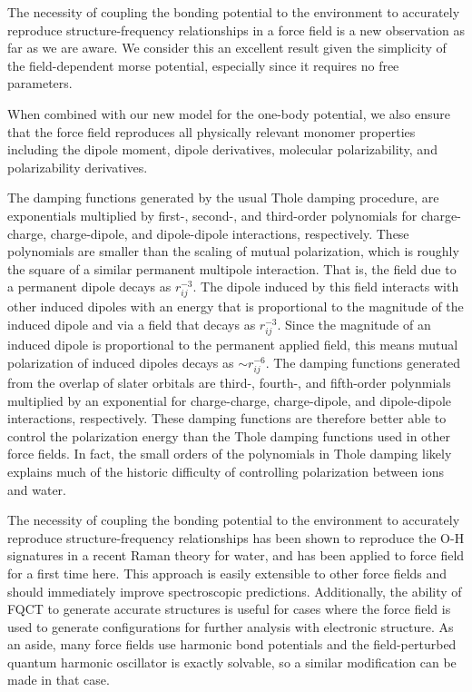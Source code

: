\documentclass[journal=jctcce,manuscript=article]{achemso}
\begin{document}
The necessity of coupling the bonding potential to the environment to accurately reproduce structure-frequency relationships in a force field is a new observation as far as we are aware. We consider this an excellent result given the simplicity of the field-dependent morse potential, especially since it requires no free parameters. 

When combined with our new model for the one-body potential, we also ensure that the force field reproduces all physically relevant monomer properties including the dipole moment, dipole derivatives,
molecular polarizability, and polarizability derivatives. 

The damping functions generated by the usual Thole damping procedure\cite{thole1981molecular},
are exponentials multiplied by first-, second-, and third-order polynomials
for charge-charge, charge-dipole, and dipole-dipole interactions, respectively.\cite{thole1981molecular}
These polynomials are smaller than the scaling of mutual polarization, which is roughly the square
of a similar permanent multipole interaction. That is, the field due to a permanent dipole
decays as $r_{ij}^{-3}$. The dipole induced by this field interacts with other induced dipoles
with an energy that is proportional to the magnitude of the induced dipole and via a field
that decays as $r_{ij}^{-3}$. Since the magnitude of an induced dipole is proportional to
the permanent applied field, this means mutual polarization of induced dipoles decays as $\sim$$r_{ij}^{-6}$. The damping functions generated from the overlap of slater orbitals are
third-, fourth-, and fifth-order polynmials multiplied by an exponential for charge-charge, charge-dipole,
and dipole-dipole interactions, respectively. These damping functions are therefore better able
to control the polarization energy than the Thole damping functions used in other force fields.
In fact, the small orders of the polynomials in Thole damping likely explains much of the historic difficulty of controlling
polarization between ions and water.\cite{jiao2006simulation,mason2012accurate}

The necessity of coupling the bonding potential to the environment to accurately reproduce structure-frequency relationships has been shown to reproduce the O-H signatures in a recent Raman theory for water\cite{LaCour2023}, and has been applied to force field for a first time here. This approach is easily extensible to other force fields and should immediately improve spectroscopic predictions. Additionally, the ability of FQCT to generate accurate structures is useful for cases where the force field is used to generate configurations for further analysis with electronic structure. As an aside, many force fields use harmonic bond potentials and the field-perturbed quantum harmonic oscillator is exactly solvable, so a similar modification can be made in that case.
\end{document}
